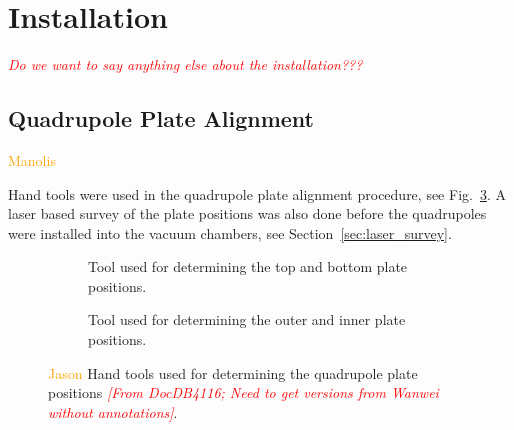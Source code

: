 \section{\label{sec:install} Installation}

\textcolor{red}{\textit{Do we want to say anything else about the installation???}}

\subsection{\label{sec:pulsers} Quadrupole Plate Alignment}
\textcolor{orange}{Manolis}
\medskip

Hand tools were used in the quadrupole plate alignment procedure, see Fig.~\ref{fig:align_hand_tools}. A laser based survey of the plate positions was also done before the quadrupoles were installed into the vacuum chambers, see Section~\ref{sec:laser_survey}.
\begin{figure}[]
	\centering
	\begin{subfigure}{\columnwidth}
		\caption{Tool used for determining the top and bottom plate positions.}\label{fig:align_hand_tool_vert}
	\end{subfigure}
	\begin{subfigure}{\columnwidth}
		\caption{Tool used for determining the outer and inner plate positions.}\label{fig:align_hand_tool_horiz}
	\end{subfigure}
	\caption{\textcolor{orange}{Jason} Hand tools used for determining the quadrupole plate positions \textcolor{red}{\textit{[From DocDB4116; Need to get versions from Wanwei without annotations]}}.}\label{fig:align_hand_tools}
\end{figure}

